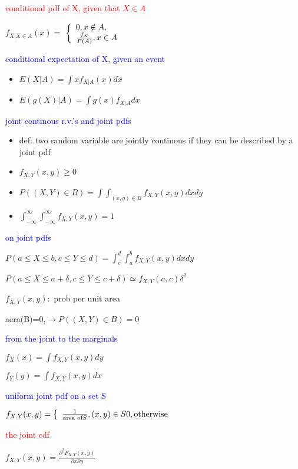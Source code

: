\textcolor{red}{conditional pdf of X, given that $X\in A$}

$f_{X|X \in A}(x)=$ $\left\{\begin{array}[pos]{l}
    0, x \notin A,\\
    \frac{f_X}{P(A)}, x \in A
\end{array} \right.$


\textcolor{blue}{conditional expectation of X, given an event}

\begin{itemize}
    \item $E(X|A)=\int xf_{X|A}(x)dx$
    \item $E(g(X)|A)=\int g(x)f_{X|A}dx$
\end{itemize}


\textcolor{blue}{joint continous r.v.'s and joint pdfs}

\begin{itemize}
    \item def: two random variable are jointly continous if they can be described by a joint pdf
    \item $f_{X,Y}(x,y)\ge 0$
    \item $P((X,Y)\in B)=\int \int _{(x,y)\in B}f_{X,Y}(x,y)dxdy$
    \item $\int_{-\infty}^\infty\int_{-\infty}^\infty f_{X,Y}(x,y)=1$
\end{itemize}

\textcolor{blue}{on joint pdfs}

$P(a\le X \le b, c\le Y \le d)=\int_c^d \int_a^b f_{X,Y}(x,y)dxdy$

$P(a\le X \le a+\delta,c\le Y \le c+\delta)\simeq f_{X,Y}(a,c)\delta^2$

$f_{X,Y}(x,y):$ prob per unit area

aera(B)=0,$\rightarrow P((X,Y)\in B)=0$

\textcolor{blue}{from the joint to the marginals}

$f_X(x)=\int f_{X,Y}(x,y)dy$

$f_Y(y)=\int f_{X,Y}(x,y)dx$

\textcolor{blue}{uniform joint pdf on a set S}

$f_{X,Y}(x,y)=\left\{ \begin{array}[pos]{l}
    \frac{1}{\text{area of} S}, (x,y) \in S
    0,\text{otherwise}
\end{array}\right.$

\textcolor{red}{the joint cdf}

$f_{X,Y}(x,y)=\frac{\partial ^2 F_{X,Y}(x,y)}{\partial x \partial y}$

